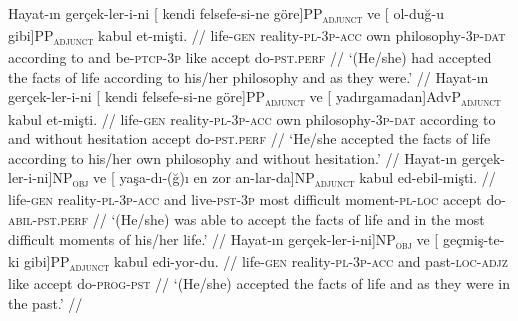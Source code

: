 \pex[exno=TS7, glspace=!1em,everygla={},everyglb={},aboveglbskip=-.15ex, interpartskip=15pt]
\label{TS7} 
\a
\begingl
\gla Hayat-ın gerçek-ler-i-ni {[} kendi felsefe-si-ne {göre}]PP\textsubscript{\textsc{adjunct}} ve {[} ol-duğ-u {gibi}]PP\textsubscript{\textsc{adjunct}} kabul et-mişti. //
\glb life-\textsc{gen} reality-\textsc{pl}-\textsc{3p}-\textsc{acc} own philosophy-\textsc{3p}-\textsc{dat} {according to} and be-\textsc{ptcp}-\textsc{3p} like accept do-\textsc{pst.perf} //
\glft `(He/she) had accepted the facts of life according to his/her philosophy and as they were.' //
\endgl
\a
\begingl
\gla Hayat-ın gerçek-ler-i-ni {[} kendi felsefe-si-ne {göre}]PP\textsubscript{\textsc{adjunct}} ve {[} {yadırgamadan}]AdvP\textsubscript{\textsc{adjunct}} kabul et-mişti. //
\glb life-\textsc{gen} reality-\textsc{pl}-\textsc{3p}-\textsc{acc} own philosophy-\textsc{3p}-\textsc{dat} {according to} and {without hesitation} accept do-\textsc{pst.perf} //
\glft `He/she accepted the facts of life according to his/her own philosophy and without hesitation.' //
\endgl
\a
\begingl
\gla {[} Hayat-ın {gerçek-ler-i-ni}]NP\textsubscript{\textsc{obj}} ve {[} yaşa-dı-(ğ)ı en zor {an-lar-da}]NP\textsubscript{\textsc{adjunct}} kabul ed-ebil-mişti. //
\glb life-\textsc{gen} reality-\textsc{pl}-\textsc{3p}-\textsc{acc} and live-\textsc{pst}-\textsc{3p} most difficult moment-\textsc{pl}-\textsc{loc} accept do-\textsc{abil}-\textsc{pst.perf} //
\glft `(He/she) was able to accept the facts of life and in the most difficult moments of his/her life.' //
\endgl
\a
\begingl
\gla {[} Hayat-ın {gerçek-ler-i-ni}]NP\textsubscript{\textsc{obj}} ve {[} geçmiş-te-ki {gibi}]PP\textsubscript{\textsc{adjunct}} kabul edi-yor-du. //
\glb life-\textsc{gen} reality-\textsc{pl}-\textsc{3p}-\textsc{acc} and past-\textsc{loc}-\textsc{adjz} like accept do-\textsc{prog}-\textsc{pst} //
\glft `(He/she) accepted the facts of life and as they were in the past.' //
\endgl
\xe


